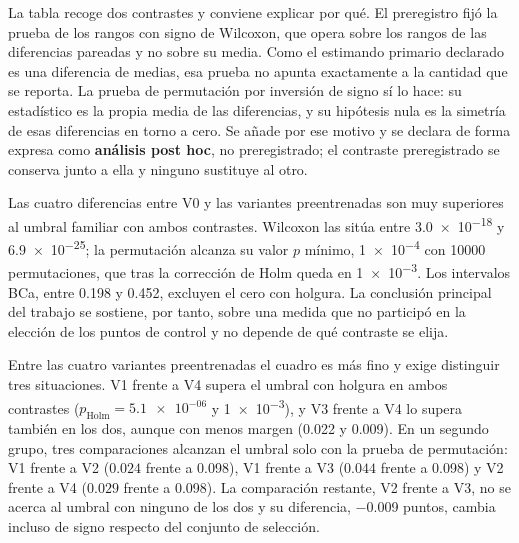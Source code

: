 La tabla recoge dos contrastes y conviene explicar por qu\'e. El preregistro fij\'o la
prueba de los rangos con signo de Wilcoxon, que opera sobre los rangos de las diferencias
pareadas y no sobre su media. Como el estimando primario declarado es una diferencia de
medias, esa prueba no apunta exactamente a la cantidad que se reporta. La prueba de
permutaci\'on por inversi\'on de signo s\'i lo hace: su estad\'istico es la propia media
de las diferencias, y su hip\'otesis nula es la simetr\'ia de esas diferencias en torno a
cero. Se a\~nade por ese motivo y se declara de forma expresa como \textbf{an\'alisis post
hoc}, no preregistrado; el contraste preregistrado se conserva junto a ella y ninguno
sustituye al otro.

Las cuatro diferencias entre V0 y las variantes preentrenadas son muy superiores al umbral
familiar con ambos contrastes. Wilcoxon las sit\'ua entre \num{3.0e-18} y \num{6.9e-25};
la permutaci\'on alcanza su valor $p$ m\'inimo, \num{1e-4} con \num{10000} permutaciones,
que tras la correcci\'on de Holm queda en \num{1e-3}. Los intervalos BCa, entre
\num{0.198} y \num{0.452}, excluyen el cero con holgura. La conclusi\'on principal del
trabajo se sostiene, por tanto, sobre una medida que no particip\'o en la elecci\'on de
los puntos de control y no depende de qu\'e contraste se elija.

Entre las cuatro variantes preentrenadas el cuadro es m\'as fino y exige distinguir tres
situaciones. V1 frente a V4 supera el umbral con holgura en ambos contrastes
($p_{\mathrm{Holm}} = \num{5.1e-06}$ y \num{1e-3}), y V3 frente a V4 lo supera tambi\'en en
los dos, aunque con menos margen (\num{0.022} y \num{0.009}). En un segundo grupo, tres
comparaciones alcanzan el umbral solo con la prueba de permutaci\'on: V1 frente a V2
($\num{0.024}$ frente a \num{0.098}), V1 frente a V3 ($\num{0.044}$ frente a \num{0.098}) y
V2 frente a V4 ($\num{0.029}$ frente a \num{0.098}). La comparaci\'on restante, V2 frente a
V3, no se acerca al umbral con ninguno de los dos y su diferencia, \num{-0.009} puntos,
cambia incluso de signo respecto del conjunto de selecci\'on.

